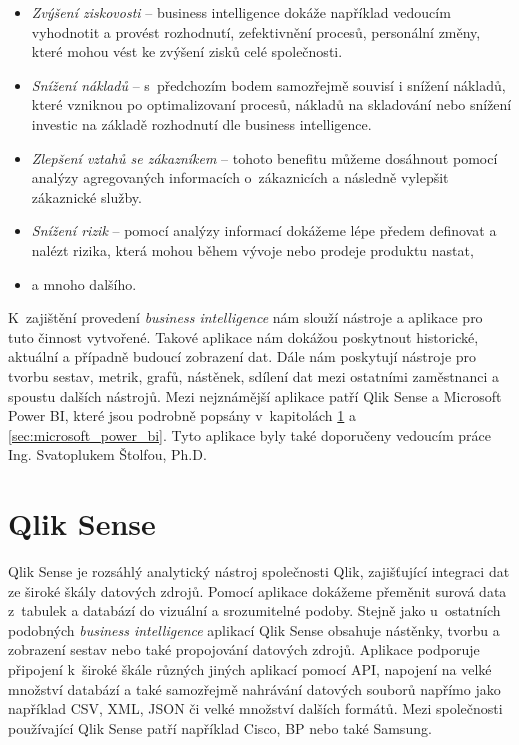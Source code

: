 \documentclass[czech,master]{diploma}
\begin{document}
\begin{itemize}
\item \textit{Zvýšení ziskovosti} -- business intelligence dokáže například vedoucím vyhodnotit a provést rozhodnutí, zefektivnění procesů, personální změny, které mohou vést ke zvýšení zisků celé společnosti.
\item \textit{Snížení nákladů} -- s~předchozím bodem samozřejmě souvisí i snížení nákladů, které vzniknou po optimalizovaní procesů, nákladů na skladování nebo snížení investic na základě rozhodnutí dle business intelligence.
\item \textit{Zlepšení vztahů se zákazníkem} -- tohoto benefitu můžeme dosáhnout pomocí analýzy agregovaných informacích o~zákaznicích a následně vylepšit zákaznické služby.
\item \textit{Snížení rizik} -- pomocí analýzy informací dokážeme lépe předem definovat a nalézt rizika, která mohou během vývoje nebo prodeje produktu nastat,
\item a mnoho dalšího.
\end{itemize}

K~zajištění provedení \textit{business intelligence} nám slouží nástroje a aplikace pro tuto činnost vytvořené. Takové aplikace nám dokážou poskytnout historické, aktuální a případně budoucí zobrazení dat. Dále nám poskytují nástroje pro tvorbu sestav, metrik, grafů, nástěnek, sdílení dat mezi ostatními zaměstnanci a spoustu dalších nástrojů. Mezi nejznámější aplikace patří Qlik Sense a Microsoft Power BI, které jsou podrobně popsány v~kapitolách \ref{sec:qlik} a \ref{sec:microsoft_power_bi}. Tyto aplikace byly také doporučeny vedoucím práce Ing. Svatoplukem Štolfou, Ph.D.

\section{Qlik Sense}
\label{sec:qlik}
Qlik Sense je rozsáhlý analytický nástroj společnosti Qlik, zajišťující integraci dat ze široké škály datových zdrojů. Pomocí aplikace dokážeme přeměnit surová data z~tabulek a databází do vizuální a srozumitelné podoby. Stejně jako u~ostatních podobných \textit{business intelligence} aplikací Qlik Sense obsahuje nástěnky, tvorbu a zobrazení sestav nebo také propojování datových zdrojů. Aplikace podporuje připojení k~široké škále různých jiných aplikací pomocí API, napojení na velké množství databází a také samozřejmě nahrávání datových souborů napřímo jako například CSV, XML, JSON či velké množství dalších formátů. Mezi společnosti používající Qlik Sense patří například Cisco, BP nebo také Samsung. \cite{ref:qlik_general}
\end{document}
